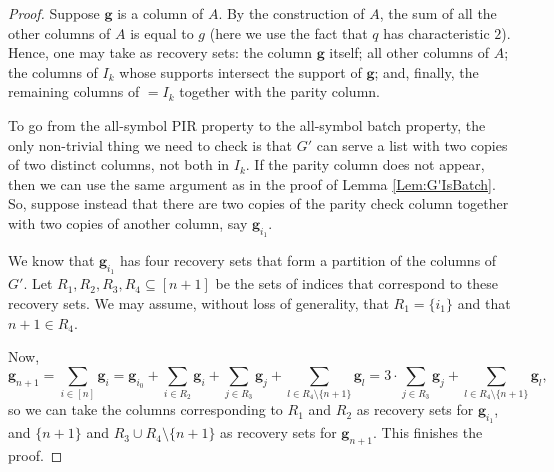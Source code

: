 \documentclass[10pt,a4paper]{amsart}
\newcommand{\bfe}{{\boldsymbol e}}
\newcommand{\bfg}{{\boldsymbol g}}
\begin{document}
\begin{proof}
    
    Suppose $\bfg$ is a column of $A$.
    By the construction of $A$, the sum of all the other columns of $A$ is equal to $g$ (here we use the fact that $q$ has characteristic $2$).  Hence, one may take as recovery sets: the column $\bfg$ itself; all other columns of $A$; the columns of $I_k$ whose supports intersect the support of $\bfg$; and, finally, the remaining columns of  $=I_k$ together with the parity column.   

    To go from the all-symbol PIR property to the all-symbol batch property, the only non-trivial thing we need to check is that $G'$ can serve a list with two copies of two distinct columns, not both in $I_k$. If the parity column does not appear, then we can use the same argument as in the proof of Lemma \ref{Lem:G'IsBatch}. So, suppose instead that there are two copies of the parity check column together with two copies of another column, say $\bfg_{i_1}$. 
    
    We know that $\bfg_{i_1}$ has four recovery sets that form a partition of the columns of $G'$. Let $R_1,R_2,R_3,R_4\subseteq [n+1]$ be the sets of indices that correspond to these recovery sets. We may assume, without loss of generality, that $R_1 = \{i_1\}$ and that $n+1\in R_4$.

    Now, 
    $$
        \bfg_{n+1} = \sum_{i \in [n]} \bfg_i  = \bfg_{i_0} + \sum_{i\in R_2}\bfg_i + \sum_{j\in R_3}\bfg_j + \sum_{l \in R_4\setminus\{n+1\}} \bfg_l = 3\cdot\sum_{j\in R_3}\bfg_j + \sum_{l \in R_4\setminus\{n+1\}} \bfg_l,
    $$
    so we can take the columns corresponding to $R_1$ and $R_2$ as recovery sets for $\bfg_{i_1}$, and $\{n+1\}$ and $R_3 \cup R_4\setminus \{n+1\}$ as recovery sets for $\bfg_{n+1}$. This finishes the proof.
\end{proof}
\end{document}
